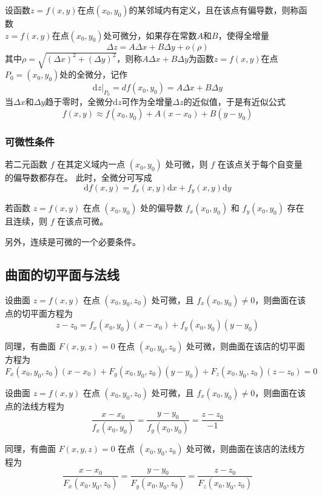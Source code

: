 \begin{definition}
    设函数$z=f(x,y)$在点$(x_0,y_0)$的某邻域内有定义，且在该点有偏导数，则称函数\\$z=f(x,y)$在点$(x_0,y_0)$处可微分，如果存在常数$A$和$B$，使得全增量
        \[
            \Delta z=A\Delta x+B\Delta y+o(\rho)
        \]
        其中$\rho=\sqrt{(\Delta x)^2+(\Delta y)^2}$，则称$A\Delta x+B\Delta y$为函数$z=f(x,y)$在点$P_0=(x_0,y_0)$处的全微分，记作
        \[
            \left.\mathrm{d}z\right|_{P_0}=df(x_0,y_0)=A\Delta x+B\Delta y
        \]
        当$\Delta x$和$\Delta y$趋于零时，全微分$\mathrm{d}z$可作为全增量$\Delta z$的近似值，于是有近似公式
    \[
        f(x,y)\approx f(x_0,y_0)+A(x-x_0)+B(y-y_0)
    \]
\end{definition}

\subsubsection{可微性条件}


\begin{theorem}
    若二元函数 $f$ 在其定义域内一点 $(x_0,y_0)$ 处可微，则 $f$ 在该点关于每个自变量的偏导数都存在。
    此时，全微分可写成
    \[
        \mathrm{d}f(x,y)=f_x(x,y)\mathrm{d}x+f_y(x,y)\mathrm{d}y
    \]
\end{theorem}

\begin{theorem}[可微的充分条件]
    若函数 $z=f(x,y)$ 在点 $(x_0,y_0)$ 处的偏导数 $f_x(x_0,y_0)$ 和 $f_y(x_0,y_0)$ 存在且连续，则 $f$ 在该点可微。
\end{theorem}

另外，连续是可微的一个必要条件。

\subsection{曲面的切平面与法线}

\begin{definition}
    设曲面 $z=f(x,y)$ 在点 $(x_0,y_0,z_0)$ 处可微，且 $f_x(x_0,y_0)\neq 0$，则曲面在该点的切平面方程为
    \[
        z-z_0=f_x(x_0,y_0)(x-x_0)+f_y(x_0,y_0)(y-y_0)
    \]
\end{definition}

同理，有曲面 $F(x,y,z)=0$ 在点 $(x_0,y_0,z_0)$ 处可微，则曲面在该店的切平面方程为
\[
    F_x(x_0,y_0,z_0)(x-x_0)+F_y(x_0,y_0,z_0)(y-y_0)+F_z(x_0,y_0,z_0)(z-z_0)=0
\]

\begin{definition}
    设曲面 $z=f(x,y)$ 在点 $(x_0,y_0,z_0)$ 处可微，且 $f_x(x_0,y_0)\neq 0$，则曲面在该点的法线方程为
    \[
        \frac{x-x_0}{f_x(x_0,y_0)}=\frac{y-y_0}{f_y(x_0,y_0)}=\frac{z-z_0}{-1}
    \]
\end{definition}

同理，有曲面 $F(x,y,z)=0$ 在点 $(x_0,y_0,z_0)$ 处可微，则曲面在该店的法线方程为
\[
    \frac{x-x_0}{F_x(x_0,y_0,z_0)}=\frac{y-y_0}{F_y(x_0,y_0,z_0)}=\frac{z-z_0}{F_z(x_0,y_0,z_0)}
\]


